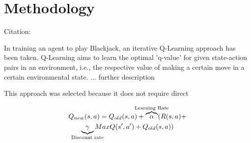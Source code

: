 \section{Methodology}

Citation: \cite{ARXIVEXAMPLE}

In training an agent to play Blackjack, an iterative Q-Learning approach has been taken. Q-Learning aims to learn the optimal 'q-value' for given state-action pairs in an environment, i.e., the respective value of making a certain move in a certain environmental state. ... further description

This approach was selected because it does not require direct 


\begin{multline}
    Q_{new}(s,a)=Q_{old}(s,a)+\overbrace{\alpha}^{\mathclap{\text{Learning Rate}}}(R(s,a)+\\ \underbrace{\gamma}_{\mathclap{\text{Discount rate}}}MaxQ(s',a')+Q_{old}(s,a))
\end{multline}
